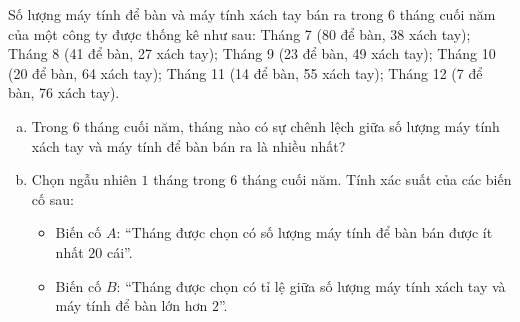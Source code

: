 \begin{bt}%
	Số lượng máy tính để bàn và máy tính xách tay bán ra trong $6$ tháng cuối năm của một công ty được thống kê như sau: Tháng 7 (80 để bàn, 38 xách tay); Tháng 8 (41 để bàn, 27 xách tay); Tháng 9 (23 để bàn, 49 xách tay); Tháng 10 (20 để bàn, 64 xách tay); Tháng 11 (14 để bàn, 55 xách tay); Tháng 12 (7 để bàn, 76 xách tay).
	\begin{enumerate}[a)]
		\item Trong $6$ tháng cuối năm, tháng nào có sự chênh lệch giữa số lượng máy tính xách tay và máy tính để bàn bán ra là nhiều nhất?
		\item Chọn ngẫu nhiên $1$ tháng trong $6$ tháng cuối năm. Tính xác suất của các biến cố sau:
		\begin{itemize}
			\item Biến cố $A$: ``Tháng được chọn có số lượng máy tính để bàn bán được ít nhất $20$ cái''.
			\item Biến cố $B$: ``Tháng được chọn có tỉ lệ giữa số lượng máy tính xách tay và máy tính để bàn lớn hơn $2$''.
		\end{itemize}
	\end{enumerate}
\end{bt}
